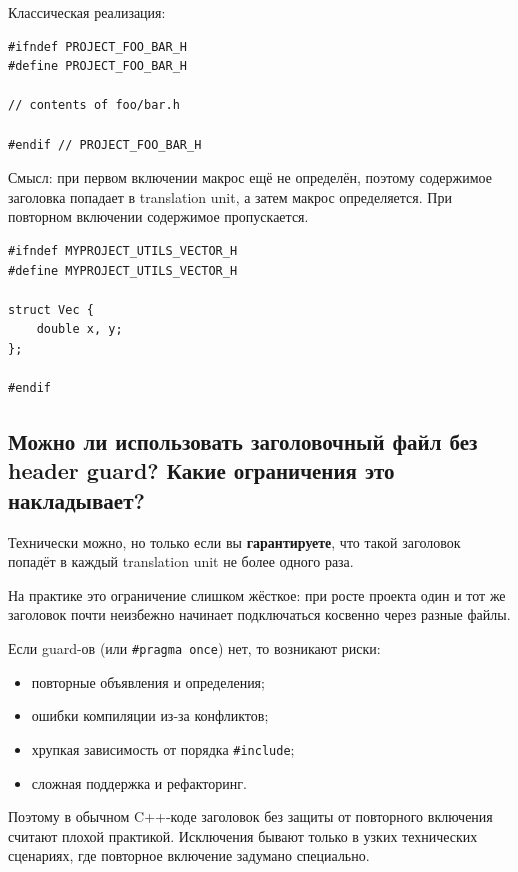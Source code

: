 Классическая реализация:
\begin{verbatim}
#ifndef PROJECT_FOO_BAR_H
#define PROJECT_FOO_BAR_H

// contents of foo/bar.h

#endif // PROJECT_FOO_BAR_H
\end{verbatim}

Смысл: при первом включении макрос ещё не определён, поэтому содержимое заголовка попадает в translation unit, а затем макрос определяется. При повторном включении содержимое пропускается.

\begin{example}
\begin{verbatim}
#ifndef MYPROJECT_UTILS_VECTOR_H
#define MYPROJECT_UTILS_VECTOR_H

struct Vec {
    double x, y;
};

#endif
\end{verbatim}
\end{example}

\subsection{Можно ли использовать заголовочный файл без header guard? Какие ограничения это накладывает?}
Технически можно, но только если вы \textbf{гарантируете}, что такой заголовок попадёт в каждый translation unit не более одного раза.

На практике это ограничение слишком жёсткое: при росте проекта один и тот же заголовок почти неизбежно начинает подключаться косвенно через разные файлы.

Если guard-ов (или \texttt{\#pragma once}) нет, то возникают риски:
\begin{itemize}
    \item повторные объявления и определения;
    \item ошибки компиляции из-за конфликтов;
    \item хрупкая зависимость от порядка \texttt{\#include};
    \item сложная поддержка и рефакторинг.
\end{itemize}

\begin{remark}
Поэтому в обычном C++-коде заголовок без защиты от повторного включения считают плохой практикой. Исключения бывают только в узких технических сценариях, где повторное включение задумано специально.
\end{remark}

